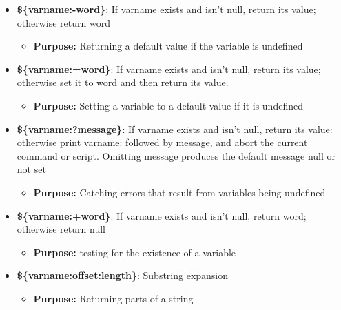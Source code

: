\documentclass{report}
\begin{document}
    \pagebreak 
    \begin{itemize}
        \item \textbf{\$\{varname:-word\}}: If varname exists and isn't null, return its value; otherwise return word
            \begin{itemize}
                \item \textbf{Purpose:} Returning a default value if the variable is undefined
            \end{itemize}
        \item \textbf{\$\{varname:=word\}}: If varname exists and isn't null, return its value; otherwise set it to word and then return its value.
            \begin{itemize}
                  \item \textbf{Purpose:} Setting a variable to a default value if it is undefined
            \end{itemize}
        \item \textbf{\$\{varname:?message\}}: If varname exists and isn't null, return its value: otherwise print varname: followed by message, and abort the current command or script. Omitting message produces the default message null or not set
            \begin{itemize}
                 \item \textbf{Purpose:} Catching errors that result from variables being undefined
            \end{itemize}
        \item \textbf{\$\{varname:+word\}}: If varname exists and isn't null, return word; otherwise return null
            \begin{itemize}
                \item \textbf{Purpose:}  testing for the existence of a variable
            \end{itemize}
        \item \textbf{\$\{varname:offset:length\}}: Substring expansion
            \begin{itemize}
                \item \textbf{Purpose:} Returning parts of a string
            \end{itemize}
    \end{itemize}
\end{document}
